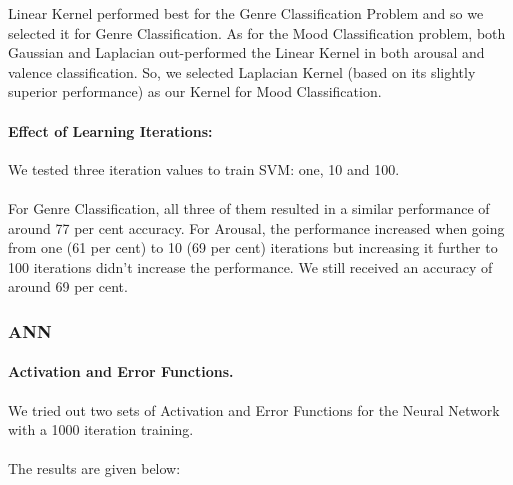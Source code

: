 Linear Kernel performed best for the Genre Classification Problem and so we selected it for Genre Classification. 
As for the Mood Classification problem, both Gaussian and Laplacian out-performed the Linear Kernel in both arousal and valence classification. So, we selected Laplacian Kernel (based on its slightly superior performance) as our Kernel for Mood Classification.

\paragraph{Effect of Learning Iterations:}
We tested three iteration values to train SVM: one, 10 and 100.\\ 
\\
For Genre Classification, all three of them resulted in a similar performance of around 77 per cent accuracy.
For Arousal, the performance increased when going from one (61 per cent) to 10 (69 per cent) iterations but increasing it further to 100 iterations didn’t increase the performance. We still received an accuracy of around 69 per cent.

\subsubsection{ANN}
\paragraph{Activation and Error Functions.}
We tried out two sets of Activation and Error Functions for the Neural Network with a 1000 iteration training.\\
\\
The results are given below:\\

